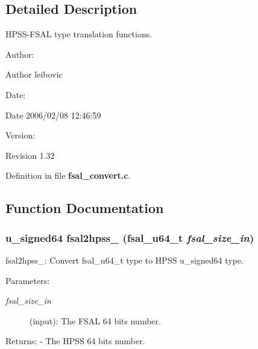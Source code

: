 \subsection{Detailed Description}
HPSS-FSAL type translation functions. 

\begin{Desc}
\item[Author:]\end{Desc}
\begin{Desc}
\item[Author]leibovic \end{Desc}
\begin{Desc}
\item[Date:]\end{Desc}
\begin{Desc}
\item[Date]2006/02/08 12:46:59 \end{Desc}
\begin{Desc}
\item[Version:]\end{Desc}
\begin{Desc}
\item[Revision]1.32 \end{Desc}


Definition in file {\bf fsal\_\-convert.c}.

\subsection{Function Documentation}
\subsubsection[{fsal2hpss\_\-64}]{\setlength{\rightskip}{0pt plus 5cm}u\_\-signed64 fsal2hpss\_ (fsal\_\-u64\_\-t {\em fsal\_\-size\_\-in})}\label{fsal__convert_8c_3be6f72cf25b694659cd9bd268ba2eee}


fsal2hpss\_: Convert fsal\_\-u64\_\-t type to HPSS u\_\-signed64 type.

\begin{Desc}
\item[Parameters:]
\begin{description}
\item[{\em fsal\_\-size\_\-in}](input): The FSAL 64 bits number.\end{description}
\end{Desc}
\begin{Desc}
\item[Returns:]- The HPSS 64 bits number. \end{Desc}


